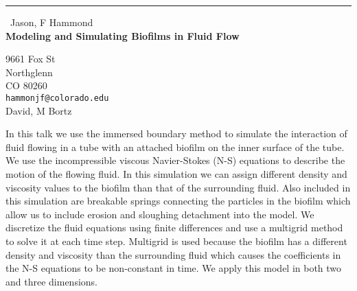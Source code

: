 \documentclass{report}
\begin{document}
\begin{center}
\rule{6in}{1pt} \
{\large Jason, F Hammond \\
{\bf Modeling and Simulating Biofilms in Fluid Flow }}

9661 Fox St \\ Northglenn \\ CO 80260
\\
{\tt hammonjf@colorado.edu}\\
David, M Bortz\end{center}

In this talk we use the immersed boundary method to simulate the
interaction of fluid flowing in a tube with an attached biofilm on the
inner surface of the tube. We use the incompressible viscous
Navier-Stokes (N-S) equations to describe the motion of the flowing
fluid. In this simulation we can assign different density and viscosity
values to the biofilm than that of the surrounding fluid. Also included
in this simulation are breakable springs connecting the particles in the
biofilm which allow us to include erosion and sloughing detachment into
the model. We discretize the fluid equations using finite differences and
use a multigrid method to solve it at each time step. Multigrid is used
because the biofilm has a different density and viscosity than the
surrounding fluid which causes the coefficients in the N-S equations to
be non-constant in time. We apply this model in both two and three
dimensions.
\end{document}
